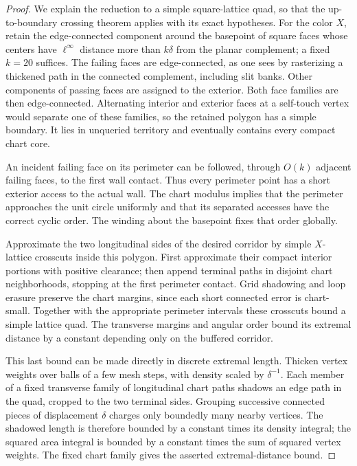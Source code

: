 \begin{proof}
We explain the reduction to a simple square-lattice quad, so that the
up-to-boundary crossing theorem applies with its exact hypotheses.
For the color $X$, retain the edge-connected component around the
basepoint of square faces whose centers have $\ell^\infty$ distance
more than $k\delta$ from the planar complement; a fixed $k=20$
suffices.  The failing faces are edge-connected, as one sees by
rasterizing a thickened path in the connected complement, including
slit banks.  Other components of passing faces are assigned to the
exterior.  Both face families are then edge-connected.  Alternating
interior and exterior faces at a self-touch vertex would separate one
of these families, so the retained polygon has a simple boundary.
It lies in unqueried territory and eventually contains every compact
chart core.

An incident failing face on its perimeter can be followed, through
$O(k)$ adjacent failing faces, to the first wall contact.  Thus every
perimeter point has a short exterior access to the actual wall.  The
chart modulus implies that the perimeter approaches the unit circle
uniformly and that its separated accesses have the correct cyclic
order.  The winding about the basepoint fixes that order globally.

Approximate the two longitudinal sides of the desired corridor by
simple $X$-lattice crosscuts inside this polygon.  First approximate
their compact interior portions with positive clearance; then append
terminal paths in disjoint chart neighborhoods, stopping at the first
perimeter contact.  Grid shadowing and loop erasure preserve the chart
margins, since each short connected error is chart-small.  Together
with the appropriate perimeter intervals these crosscuts bound a
simple lattice quad.  The transverse margins and angular order bound
its extremal distance by a constant depending only on the buffered
corridor.

This last bound can be made directly in discrete extremal length.
Thicken vertex weights over balls of a few mesh steps, with density
scaled by $\delta^{-1}$.  Each member of a fixed transverse family of
longitudinal chart paths shadows an edge path in the quad, cropped to
the two terminal sides.  Grouping successive connected pieces of
displacement $\delta$ charges only boundedly many nearby vertices.
The shadowed length is therefore bounded by a constant times its
density integral; the squared area integral is bounded by a constant
times the sum of squared vertex weights.  The fixed chart family gives
the asserted extremal-distance bound.


\end{proof}
